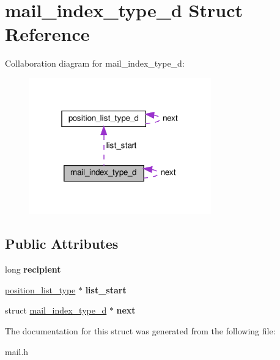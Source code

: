 \hypertarget{structmail__index__type__d}{}\section{mail\+\_\+index\+\_\+type\+\_\+d Struct Reference}
\label{structmail__index__type__d}


Collaboration diagram for mail\+\_\+index\+\_\+type\+\_\+d\+:
\nopagebreak
\begin{figure}[H]
\begin{center}
\leavevmode
\includegraphics[width=223pt]{structmail__index__type__d__coll__graph}
\end{center}
\end{figure}
\subsection*{Public Attributes}
\begin{DoxyCompactItemize}
\item 
\mbox{\label{structmail__index__type__d_a411fe473fdf97a11361407dafaa76250}} 
long {\bfseries recipient}
\item 
\mbox{\label{structmail__index__type__d_abba24aaabddf97b1a9d8da88940d8ba4}} 
\hyperlink{structposition__list__type__d}{position\+\_\+list\+\_\+type} $\ast$ {\bfseries list\+\_\+start}
\item 
\mbox{\label{structmail__index__type__d_a9f1f716ba6d0e33b754cc82284b04b95}} 
struct \hyperlink{structmail__index__type__d}{mail\+\_\+index\+\_\+type\+\_\+d} $\ast$ {\bfseries next}
\end{DoxyCompactItemize}


The documentation for this struct was generated from the following file\+:\begin{DoxyCompactItemize}
\item 
mail.\+h\end{DoxyCompactItemize}
